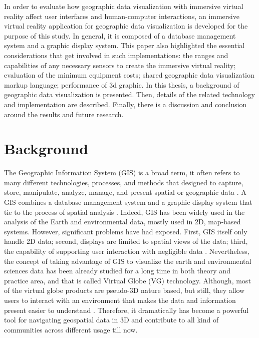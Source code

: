In order to evaluate how geographic data visualization with immersive virtual reality affect user interfaces and human-computer interactions, an immersive virtual reality application for geographic data visualization is developed for the purpose of this study. In general, it is composed of a database management system and a graphic display system. This paper also highlighted the essential considerations that get involved in such implementations: the ranges and capabilities of any necessary sensors to create the immersive virtual reality; evaluation of the minimum equipment costs; shared geographic data visualization markup language; performance of 3d graphic. In this thesis, a background of geographic data visualization is presented. Then, details of the related technology and implementation are described. Finally, there is a discussion and conclusion around the results and future research.

\section{Background}
\label{section:background}

The Geographic Information System (GIS) is a broad term, it often refers to many different technologies, processes, and methods that designed to capture, store, manipulate, analyze, manage, and present spatial or geographic data \cite{wiki.gis.2016}. A GIS combines a database management system and a graphic display system that tie to the process of spatial analysis \cite{rhyne.virtual.1997}. Indeed, GIS has been widely used in the analysis of the Earth and environmental data, mostly used in 2D, map-based systems. However, significant problems have had exposed. First, GIS itself only handle 2D data; second, displays are limited to spatial views of the data; third, the capability of supporting user interaction with negligible data \cite{rhyne.visualization-gis.1994}. Nevertheless, the concept of taking advantage of GIS to visualize the earth and environmental sciences data has been already studied for a long time in both theory and practice area, and that is called Virtual Globe (VG) technology. Although, most of the virtual globe products are pseudo-3D nature based, but still, they allow users to interact with an environment that makes the data and information present easier to understand \cite{tuttle.virtual-globes.2008}. Therefore, it dramatically has become a powerful tool for navigating geospatial data in 3D and contribute to all kind of communities across different usage till now. 


